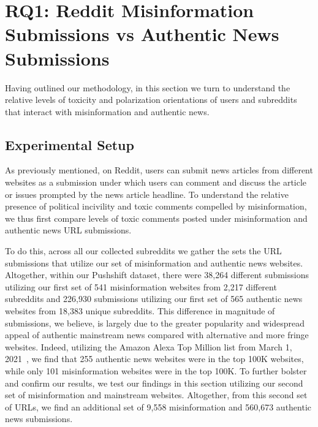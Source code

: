 \section{RQ1: Reddit Misinformation Submissions vs Authentic News Submissions}\label{sec:rq1}
Having outlined our methodology, in this section we turn to understand the relative levels of toxicity and polarization orientations of users and subreddits that interact with misinformation and authentic news. 






\subsection{Experimental Setup}
As previously mentioned, on Reddit, users can submit news articles from different websites as a submission under which users can comment and discuss the article or issues prompted by the news article headline. To understand the relative presence of political incivility and toxic comments compelled by misinformation, we thus first compare levels of toxic comments posted under misinformation and authentic news URL submissions.

To do this, across all our collected subreddits we gather the sets the URL submissions that utilize our set of misinformation and authentic news websites. Altogether, within our Pushshift dataset, there were 38,264 different submissions utilizing our first set of 541 misinformation websites from 2,217 different subreddits and 226,930 submissions utilizing our first set of 565 authentic news websites from 18,383 unique subreddits. This difference in magnitude of submissions, we believe, is largely due to the greater popularity and widespread appeal of authentic mainstream news compared with alternative and more fringe websites. Indeed, utilizing the Amazon Alexa Top Million list from March 1, 2021~\cite{amazon-top-mil}, we find that 255 authentic news websites were in the top 100K websites, while only 101 misinformation websites were in the top 100K. To further bolster and confirm our results, we test our findings in this section utilizing our second set of misinformation and mainstream websites. Altogether, from this second set of URLs, we find an additional set of 9,558 misinformation and 560,673 authentic news submissions.


